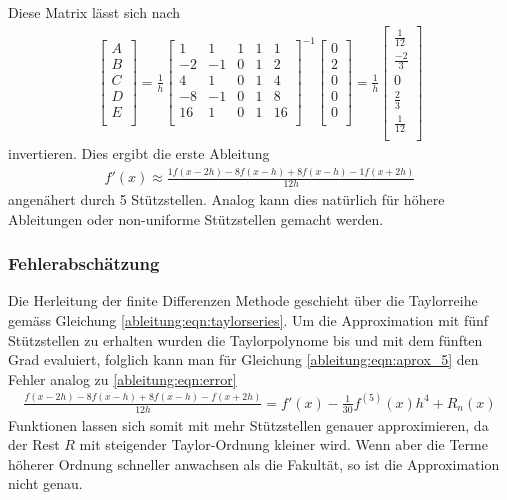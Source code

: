 Diese Matrix lässt sich nach
\begin{align}
\begin{bmatrix}
A \\
B \\
C \\
D \\
E \\
\end{bmatrix}
=
\frac{1}{h}
\begin{bmatrix}
1 & 1 & 1 & 1 & 1 \\
-2 & -1 & 0 & 1 & 2 \\
4 & 1 & 0 & 1 & 4 \\
-8 & -1 & 0 & 1 & 8 \\
16 & 1 & 0 & 1 & 16 \\
\end{bmatrix}^{-1}
\begin{bmatrix}
0 \\
2 \\
0 \\
0 \\
0 \\
\end{bmatrix}
=
\frac{1}{h}
\begin{bmatrix}
\frac{1}{12} \\
\frac{-2}{3} \\
0 \\
\frac{2}{3} \\
\frac{1}{12} \\
\end{bmatrix}
\end{align}
invertieren.
Dies ergibt die erste Ableitung
\begin{align}
f'(x)  \approx \frac{1f(x-2h) - 8f(x-h) + 8f(x-h) - 1f(x+2h)}{12h}
\label{ableitung:eqn:aprox_5}
\end{align}
angenähert durch 5 Stützstellen.
Analog kann dies natürlich für höhere Ableitungen oder non-uniforme Stützstellen gemacht werden.
\subsubsection{Fehlerabschätzung}
Die Herleitung der finite Differenzen Methode geschieht über die Taylorreihe gemäss Gleichung \ref{ableitung:eqn:taylorseries}. Um die Approximation mit fünf Stützstellen zu erhalten wurden die Taylorpolynome bis und mit dem fünften Grad evaluiert, folglich kann man für Gleichung \ref{ableitung:eqn:aprox_5} den Fehler analog zu \ref{ableitung:eqn:error}
\begin{align}
\frac{f(x-2h) - 8f(x-h) + 8f(x-h) - f(x+2h)}{12h} = f'(x) - \frac{1}{30} f^{(5)} (x)h^{4}+R_n(x)
\label{ableitung:eqn:error}
\end{align}
Funktionen lassen sich somit mit mehr Stützstellen genauer approximieren, da der Rest $R$ mit steigender Taylor-Ordnung kleiner wird. Wenn aber die Terme höherer Ordnung schneller anwachsen als die Fakultät, so ist die Approximation nicht genau.

